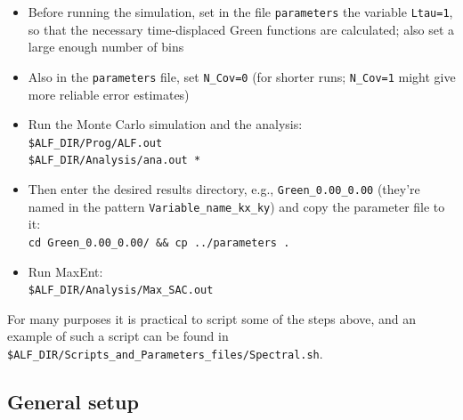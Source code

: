 \begin{itemize}[itemsep=0pt]
	\item Before running the simulation, set in the file \texttt{parameters} the variable \texttt{Ltau=1}, so that the necessary time-displaced Green functions are calculated; also set a large enough number of bins
	\item Also in the \texttt{parameters} file, set \texttt{N\_Cov=0} (for shorter runs; \texttt{N\_Cov=1} might give more reliable error estimates)
	\item Run the Monte Carlo simulation and the analysis:\\
		\lstinline[style=bash]{$ALF_DIR/Prog/ALF.out}\\
		\lstinline[style=bash]{$ALF_DIR/Analysis/ana.out *}
	\item Then enter the desired results directory, e.g., \texttt{Green\_0.00\_0.00} (they're named in the pattern \texttt{Variable\_name\_kx\_ky}) and copy the parameter file to it:\\
		\lstinline[style=bash,morekeywords={cd,cp}]{cd Green_0.00_0.00/ && cp ../parameters .}
	\item Run MaxEnt:\\
		\lstinline[style=bash]{$ALF_DIR/Analysis/Max_SAC.out}
\end{itemize}

For many purposes it is practical to script some of the steps above, and an example of such a script can be 
found in \texttt{\$ALF\_DIR/Scripts\_and\_Parameters\_files/Spectral.sh}.


\subsection{General setup}

